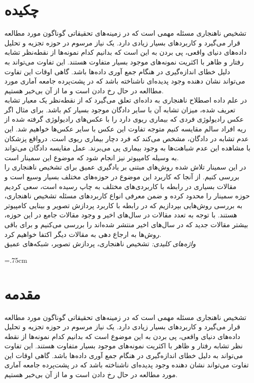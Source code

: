 \documentclass[12pt,a4paper]{report}
\newcommand*{\BeginNoToc}{%
  \addtocontents{toc}{%
    \edef\protect\SavedTocDepth{\protect\the\protect\value{tocdepth}}%
  }%
  \addtocontents{toc}{%
    \protect\setcounter{tocdepth}{-10}%
  }%
}
\newcommand*{\EndNoToc}{%
  \addtocontents{toc}{%
    \protect\setcounter{tocdepth}{\protect\SavedTocDepth}%
  }%
}
\begin{document}
	\chapter*{چکیده}
	تشخیص ناهنجاری‌ مسئله مهمی است که در زمینه‌های تحقیقاتی گوناگون مورد مطالعه قرار می‌گیرد و کاربرد‌های بسیار زیادی دارد. یک نیاز مرسوم در حوزه تجزیه و تحلیل داده‌های دنیای واقعی، پی بردن به این است که بدانیم کدام نمونه‌ها از نقطه‌نظر تشابه رفتار و ظاهر با اکثریت نمونه‌های موجود بسیار متفاوت هستند. این تفاوت می‌تواند به دلیل خطای انداز‌ه‌گیری در هنگام جمع آوری داده‌ها باشد. گاهی اوقات این تفاوت می‌تواند نشان‌ دهنده وجود پدیده‌ای ناشناخته‌ باشد که در پشت‌پرده جامعه آماری مورد مطاالعه در حال رخ دادن است و ما از آن بی‌خبر هستیم. \\

در علم داده اصطلاح ناهنجاری به داده‌ای تعلق می‌گیرد که از نقطه‌نظر یک معیار تشابه تعریف شده، میزان تشابه آن با سایر دادگان موجود بسیار کم باشد. برای مثال اگر عکس رادیولوژی فردی که بیماری ریوی دارد را با عکس‌های رادیولوژی گرفته شده از ریه افراد سالم مقایسه کنیم متوجه تفاوت این عکس با سایر عکس‌ها خواهیم شد. این عدم تشابه در دادگان، مشخص می‌کند  که فرد دچار بیماری ریوی است. درواقع پزشکان با مشاهده این عدم شباهت‌ها به وجود بیماری پی می‌برند. عمل مقایسه دادگان می‌تواند به وسیله کامپیوتر نیز انجام شود که موضوع این سمینار است.\\

در این سمینار تلاش شده روش‌های مبتنی بر یادگیری عمیق برای تشخیص ناهنجاری را بررسی کنیم. از آنجا که کاربرد این موضوع در حوزه‌های مختلف بسیار وسیع است و مقالات بسیاری در رابطه با کاربردی‌های مختلف به چاپ رسیده است، سعی کردیم حوزه سمینار را محدود کرده و ضمن معرفی انواع کاربرد‌های مسئله تشخیص ناهنجاری، به بررسی روش‌هایی بپردازیم که در رابطه با کاربرد پردازش تصویر و بینایی کامپیوتر هستند. با توجه به تعدد مقالات در سال‌های اخیر و وجود مقالات جامع در این حوزه، بیشتر مقالات جدید که در سال‌های اخیر منتشر شده‌اند را بررسی می‌کنیم و برای باقی روش‌ها به ارجاع دهی به مقالات دیگر اکتفا خواهیم کرد.\\

	\textit{
واژه‌های کلیدی:
	}
	تشخیص ناهنجاری، پردازش تصویر، شبکه‌های عمیق
	\newpage
	\baselineskip=1cm
	\BeginNoToc
	\tableofcontents
	\listoffigures
	\listoftables
	\EndNoToc
	\newpage
	\baselineskip=.75cm

\chapter{مقدمه}
	تشخیص ناهنجاری‌ مسئله مهمی است که در زمینه‌های تحقیقاتی گوناگون مورد مطالعه قرار می‌گیرد و کاربرد‌های بسیار زیادی دارد. یک نیاز مرسوم در حوزه تجزیه و تحلیل داده‌های دنیای واقعی، پی بردن به این موضوع است که بدانیم کدام نمونه‌ها از نقطه نظر تشابه رفتار و ظاهر با اکثریت نمونه‌های موجود بسیار متفاوت هستند. این تفاوت می‌تواند به دلیل خطای انداز‌ه‌گیری در هنگام جمع آوری داده‌ها باشد. گاهی اوقات این تفاوت می‌تواند نشان‌ دهنده وجود پدیده‌ای ناشناخته‌ باشد که در پشت‌پرده جامعه آماری مورد مطالعه در حال رخ دادن است و ما از آن بی‌خبر هستیم. 
	
\end{document}
